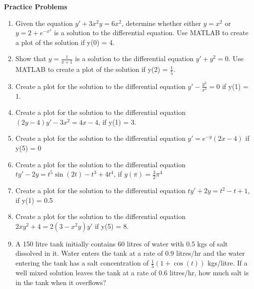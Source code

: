 \documentclass[12pt]{article}
\begin{document}
\textbf{Practice Problems}

\begin{enumerate}

\item Given the equation $y' + 3x^2y = 6x^2$, determine whether either $y = x^2$ or $y = 2 + e^{-x^3}$ is a solution to the differential equation. Use MATLAB to create a plot of the solution if y(0) = 4.


\item Show that $y = \frac{1}{x + 1}$ is a solution to the differential equation $y' + y^2 = 0$. Use MATLAB to create a plot of the solution if y(2) = $\frac{1}{5}$.

\item Create a plot for the solution to the differential equation $y' - \frac{y^2}{x^3} = 0$ if y(1) = 1.

\item Create a plot for the solution to the differential equation $(2y - 4)y' - 3x^2 = 4x - 4$, if y(1) = 3.

\item Create a plot for the solution to the differential equation $y' = e^{-y}(2x - 4)$ if y(5) = 0

\item Create a plot for the solution to the differential equation $ty' - 2y = t^5 \sin (2t) - t^3 + 4t^4$, if $y(\pi) = \frac{3}{2}\pi^4$

\item Create a plot for the solution to the differential equation $ty' + 2y = t^2 - t + 1$, if y(1) = 0.5

\item Create a plot for the solution to the differential equation $2xy^2 + 4 = 2(3 - x^2y)y'$ if y(5) = 8.

\item A 150 litre tank initially contains 60 litres of water with 0.5 kgs of salt dissolved in it.  Water enters the tank at a rate of 0.9 litres/hr and the water entering the tank has a salt concentration of $\frac{1}{5}(1 + \cos (t))$ kgs/litre. If a well mixed solution leaves the tank at a rate of 0.6 litres/hr, how much salt is in the tank when it overflows?


\end{enumerate}
\end{document}
